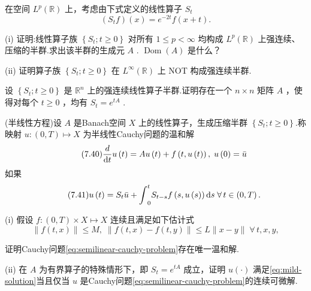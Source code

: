 \begin{rbhw}
在空间 ${L}^{p}\left( \mathbb{R}\right)$ 上，考虑由下式定义的线性算子 ${S}_{t}$
\[
\left( {{S}_{t}f}\right) \left( x\right)  = {e}^{-{2t}}f\left( {x + t}\right) .
\]

(i) 证明:线性算子族 $\left\{  {{S}_{t};t \geq  0}\right\}$ 对所有 $1 \leq  p < \infty$ 均构成 ${L}^{p}\left( \mathbb{R}\right)$ 上强连续、压缩的半群.求出该半群的生成元 $A$ . $\operatorname{Dom}\left( A\right)$ 是什么？

(ii) 证明算子族 $\left\{  {{S}_{t};t \geq  0}\right\}$ 在 ${L}^{\infty }\left( \mathbb{R}\right)$ 上 NOT 构成强连续半群.

\end{rbhw}

\begin{rbhw}
设 $\left\{  {{S}_{t};t \geq  0}\right\}$ 是 ${\mathbb{R}}^{n}$ 上的强连续线性算子半群.证明存在一个 $n \times  n$ 矩阵 $A$ ，使得对每个 $t \geq  0$ ，均有 ${S}_{t} = {e}^{tA}$ .

\end{rbhw}

\begin{rbhw}
(半线性方程)设 $A$ 是Banach空间 $X$ 上的线性算子，生成压缩半群 $\left\{  {{S}_{t};t \geq  0}\right\}$.称映射 $u : \left(  {0,T}\right)   \mapsto  X$ 为半线性Cauchy问题的温和解
\begin{equation}\tag{7.40}\label{eq:semilinear-cauchy-problem}
\frac{d}{\mathop{}\!\mathrm{d} t}u\left( t\right)  = {Au}\left( t\right)  + f\left( {t,u\left( t\right) }\right) ,\;u\left( 0\right)  = \bar{u}
\end{equation}
如果
\begin{equation}\tag{7.41}\label{eq:mild-solution}
u\left( t\right)  = {S}_{t}\bar{u} + {\int }_{0}^{t}{S}_{t - s}f\left( {s,u\left( s\right) }\right) {\mathop{}\!\mathrm{d} s}\;\forall\,t \in  \left(  {0,T}\right)  .
\end{equation}

(i) 假设 $f : \left(  {0,T}\right)   \times  X \mapsto  X$ 连续且满足如下估计式
\[
\| f\left( {t,x}\right) \|  \leq  M,\;\| f\left( {t,x}\right)  - f\left( {t,y}\right) \|  \leq  L\| x - y\| \;\forall\,t,x,y,
\]

证明Cauchy问题\eqref{eq:semilinear-cauchy-problem}存在唯一温和解.

(ii) 在 $A$ 为有界算子的特殊情形下，即 ${S}_{t} = {e}^{tA}$ 成立，证明 $u\left( \cdot \right)$ 满足\eqref{eq:mild-solution}当且仅当 $u$ 是Cauchy问题\eqref{eq:semilinear-cauchy-problem}的连续可微解.

\end{rbhw}


